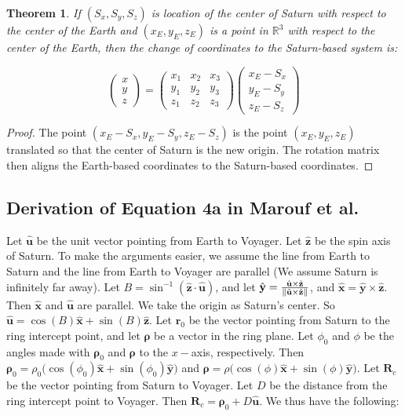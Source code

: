 \documentclass{article}
\theoremstyle{mystyle}
\newtheorem{theorem}{Theorem}[section]
\begin{document}
\begin{theorem}
If $(S_x,S_y,S_z)$ is location of the center of Saturn with respect to the center of the Earth and $(x_{E},y_{E},z_{E})$ is a point in $\mathbb{R}^3$ with respect to the center of the Earth, then the change of coordinates to the Saturn-based system is:

\begin{equation}
\begin{pmatrix} x\\y\\z \end{pmatrix} = \begin{pmatrix} x_1 & x_2 & x_3 \\ y_1 & y_2 & y_3 \\ z_1 & z_2 & z_3 \end{pmatrix} \begin{pmatrix} x_{E}-S_{x} \\ y_{E}-S_{y} \\ z_{E} - S_{z}\end{pmatrix}
\end{equation}
\end{theorem}
\begin{proof}
The point $(x_{E}-S_{x}, y_{E}-S_{y}, z_{E}-S_{z})$ is the point $(x_{E},y_{E},z_{E})$ translated so that the center of Saturn is the new origin. The rotation matrix then aligns the Earth-based coordinates to the Saturn-based coordinates.
\end{proof}

\subsection{Derivation of Equation 4a in Marouf et al.}

Let $\hat{\mathbf{u}}$ be the unit vector pointing from Earth to Voyager. Let $\hat{\mathbf{z}}$ be the spin axis of Saturn. To make the arguments easier, we assume the line from Earth to Saturn and the line from Earth to Voyager are parallel (We assume Saturn is infinitely far away). Let $B = \sin^{-1}(\hat{\mathbf{z}}\cdot \hat{\mathbf{u}})$, and let $\hat{\mathbf{y}} = \frac{\hat{\mathbf{u}}\times \hat{\mathbf{z}}}{\norm{\hat{\mathbf{u}}\times \hat{\mathbf{z}}}}$, and $\hat{\mathbf{x}} = \hat{\mathbf{y}}\times \hat{\mathbf{z}}$. Then $\hat{\mathbf{x}}$ and $\hat{\mathbf{u}}$ are parallel. We take the origin as Saturn's center. So $\hat{\mathbf{u}} = \cos(B)\hat{\mathbf{x}}+\sin(B)\hat{\mathbf{z}}$. Let $\mathbf{r}_{0}$ be the vector pointing from Saturn to the ring intercept point, and let $\boldsymbol{\rho}$ be a vector in the ring plane. Let $\phi_0$ and $\phi$ be the angles made with $\boldsymbol{\rho}_0$ and $\boldsymbol{\rho}$ to the $x-$axis, respectively. Then $\boldsymbol{\rho}_{0} = \rho_{0}\big(\cos(\phi_0)\hat{\mathbf{x}}+\sin(\phi_{0})\hat{\mathbf{y}}\big)$ and $\boldsymbol{\rho} = \rho\big(\cos(\phi)\hat{\mathbf{x}}+\sin(\phi)\hat{\mathbf{y}}\big)$. Let $\mathbf{R}_{c}$ be the vector pointing from Saturn to Voyager. Let $D$ be the distance from the ring intercept point to Voyager. Then $\mathbf{R}_{c} = \boldsymbol{\rho}_{0}+D\hat{\mathbf{u}}$. We thus have the following:
\end{document}
